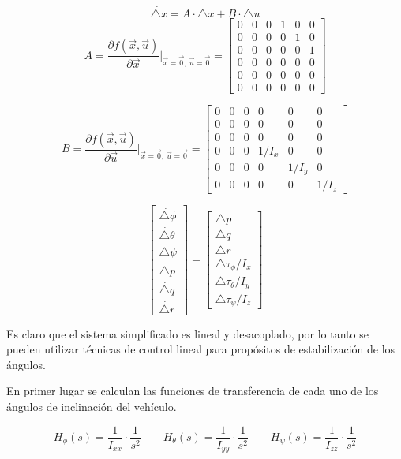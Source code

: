 \documentclass[\main/main.tex]{subfiles}
\begin{document}
\[
\dot{\triangle x}=A\cdot\triangle x+B\cdot\triangle u
\]
\[
A=\frac{\partial f(\vec{x},\vec{u})}{\partial\vec{x}}\bigg|_{\vec{x}=\vec{0},\,\vec{u}=\vec{0}}=\begin{bmatrix}0 & 0 & 0 & 1 & 0 & 0\\
0 & 0 & 0 & 0 & 1 & 0\\
0 & 0 & 0 & 0 & 0 & 1\\
0 & 0 & 0 & 0 & 0 & 0\\
0 & 0 & 0 & 0 & 0 & 0\\
0 & 0 & 0 & 0 & 0 & 0
\end{bmatrix}
\]


\[
B=\frac{\partial f(\vec{x},\vec{u})}{\partial\vec{u}}\bigg|_{\vec{x}=\vec{0},\,\vec{u}=\vec{0}}=\begin{bmatrix}0 & 0 & 0 & 0 & 0 & 0\\
0 & 0 & 0 & 0 & 0 & 0\\
0 & 0 & 0 & 0 & 0 & 0\\
0 & 0 & 0 & 1/I_{x} & 0 & 0\\
0 & 0 & 0 & 0 & 1/I_{y} & 0\\
0 & 0 & 0 & 0 & 0 & 1/I_{z}
\end{bmatrix}
\]


\[
\begin{bmatrix}\dot{\triangle\phi}\\
\dot{\triangle\theta}\\
\dot{\triangle\psi}\\
\dot{\triangle p}\\
\dot{\triangle q}\\
\dot{\triangle r}
\end{bmatrix}=\begin{bmatrix}\triangle p\\
\triangle q\\
\triangle r\\
\triangle\tau_{\phi}/I_{x}\\
\triangle\tau_{\theta}/I_{y}\\
\triangle\tau_{\psi}/I_{z}
\end{bmatrix}
\]

Es claro que el sistema simplificado es lineal y desacoplado, por
lo tanto se pueden utilizar técnicas de control lineal para propósitos
de estabilización de los ángulos. 

En primer lugar se calculan las funciones de transferencia de cada
uno de los ángulos de inclinación del vehículo.

\[
H_{\phi}(s)=\frac{1}{I_{xx}}\cdot\frac{1}{s^{2}}\qquad H_{\theta}(s)=\frac{1}{I_{yy}}\cdot\frac{1}{s^{2}}\qquad H_{\psi}(s)=\frac{1}{I_{zz}}\cdot\frac{1}{s^{2}}
\]
\end{document}
